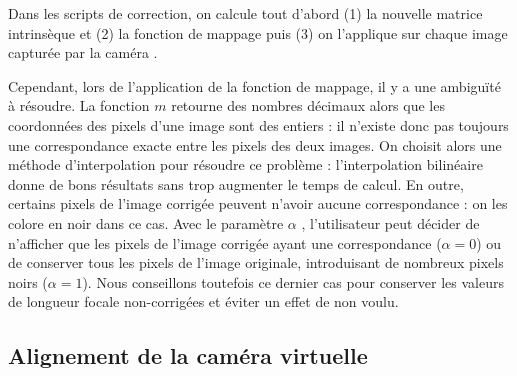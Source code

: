 Dans les scripts de correction, on calcule tout d'abord (1) la nouvelle matrice intrinsèque et (2) la fonction de mappage  puis (3) on l'applique sur chaque image capturée par la caméra .

Cependant, lors de l'application de la fonction de mappage, il y a une ambiguïté à résoudre. La fonction $m$ retourne des nombres décimaux alors que les coordonnées des pixels d'une image sont des entiers : il n'existe donc pas toujours une correspondance exacte entre les pixels des deux images. On choisit alors une méthode d'interpolation pour résoudre ce problème : l'interpolation bilinéaire donne de bons résultats sans trop augmenter le temps de calcul. En outre, certains pixels de l'image corrigée peuvent n'avoir aucune correspondance : on les colore en noir dans ce cas. Avec le paramètre $\alpha$ , l'utilisateur peut décider de n'afficher que les pixels de l'image corrigée ayant une correspondance ($\alpha = 0$) ou de conserver tous les pixels de l'image originale, introduisant de nombreux pixels noirs ($\alpha = 1$). Nous conseillons toutefois ce dernier cas pour conserver les valeurs de longueur focale non-corrigées et éviter un effet de  non voulu.


\subsection{Alignement de la caméra virtuelle}
\label{subsec:pinhole_camera_display}

